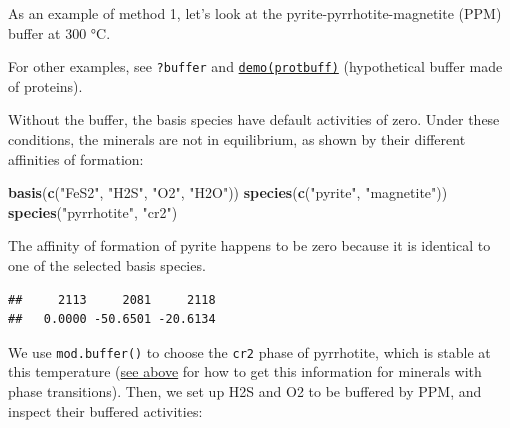 \documentclass[]{tufte-book}
\newenvironment{Shaded}{}{}
\newcommand{\KeywordTok}[1]{\textcolor[rgb]{0.00,0.44,0.13}{\textbf{#1}}}
\newcommand{\DataTypeTok}[1]{\textcolor[rgb]{0.56,0.13,0.00}{#1}}
\newcommand{\DecValTok}[1]{\textcolor[rgb]{0.25,0.63,0.44}{#1}}
\newcommand{\StringTok}[1]{\textcolor[rgb]{0.25,0.44,0.63}{#1}}
\newcommand{\OperatorTok}[1]{\textcolor[rgb]{0.40,0.40,0.40}{#1}}
\newcommand{\NormalTok}[1]{#1}
\begin{document}
As an example of method 1, let's look at the pyrite-pyrrhotite-magnetite
(PPM) buffer at 300 °C.

\begin{marginfigure}
For other examples, see {\texttt{?buffer}} and
\href{../demo}{{\texttt{demo(protbuff)}}} (hypothetical buffer made of
proteins).
\end{marginfigure}

Without the buffer, the basis species have default activities of zero.
Under these conditions, the minerals are not in equilibrium, as shown by
their different affinities of formation:

\begin{Shaded}
\begin{Highlighting}[]
\KeywordTok{basis}\NormalTok{(}\KeywordTok{c}\NormalTok{(}\StringTok{"FeS2"}\NormalTok{, }\StringTok{"H2S"}\NormalTok{, }\StringTok{"O2"}\NormalTok{, }\StringTok{"H2O"}\NormalTok{))}
\KeywordTok{species}\NormalTok{(}\KeywordTok{c}\NormalTok{(}\StringTok{"pyrite"}\NormalTok{, }\StringTok{"magnetite"}\NormalTok{))}
\KeywordTok{species}\NormalTok{(}\StringTok{"pyrrhotite"}\NormalTok{, }\StringTok{"cr2"}\NormalTok{)}
\end{Highlighting}
\end{Shaded}

\begin{marginfigure}
The affinity of formation of pyrite happens to be zero because it is
identical to one of the selected basis species.
\end{marginfigure}

\begin{Shaded}
\end{Shaded}

\begin{verbatim}
##     2113     2081     2118 
##   0.0000 -50.6501 -20.6134
\end{verbatim}

We use {\texttt{mod.buffer()}} to choose the \texttt{cr2} phase of
pyrrhotite, which is stable at this temperature
(\protect\hyperlink{mosaic-diagrams}{see above} for how to get this
information for minerals with phase transitions). Then, we set up H2S
and O2 to be buffered by PPM, and inspect their buffered activities:
\end{document}
